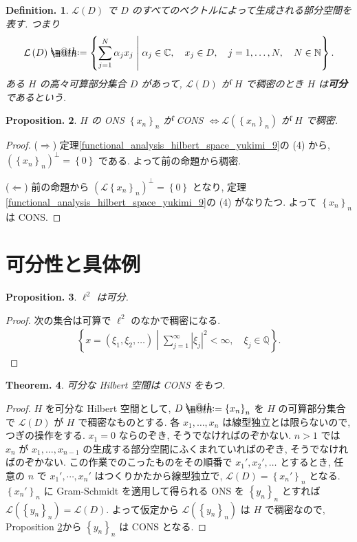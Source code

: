 \documentclass[openany, a4paper, oneside]{jsbook}
\makeatletter
\newcommand*{\defeq}{\mathrel{\rlap{%
\raisebox{0.3ex}{$\m@th\cdot$}}%
\raisebox{-0.3ex}{$\m@th\cdot$}}%
=}
\theoremstyle{break}
\newtheorem{thm}{Theorem.}[section]
\newtheorem{prop}[thm]{Proposition.}
\theoremstyle{breakdefn}
\newtheorem{defn}[thm]{Definition.}
\newcommand{\abs}[1]{\left|#1\right|}
\newcommand{\rbk}[1]{\left (#1\right)}
\newcommand{\cbk}[1]{\left\{#1\right\}}
\newcommand{\relmiddle}[1]{\mathrel{}\middle#1\mathrel{}}
\newcommand{\set}[2]{\left\{#1 \relmiddle| #2\right\}}
\newcommand{\bbC}{\mathbb{C}}
\newcommand{\bbN}{\mathbb{N}}
\newcommand{\bbQ}{\mathbb{Q}}
\newcommand{\calL}{\mathcal{L}}
\newcommand{\upbf}[1]{\textup{\textbf{#1}}}
\makeatother
\begin{document}
\begin{defn}
 $\mathcal{L}(D)$ で $D$ のすべてのベクトルによって生成される部分空間を表す.
 つまり
 \begin{align}
  \calL \rbk{D}
  \defeq
  \set{\sum_{j=1}^N \alpha_j x_j}{\alpha_j \in \bbC, \quad x_j \in D, \quad j = 1, \dots, N, \quad N \in \bbN}.
 \end{align}
 ある $H$ の高々可算部分集合 $D$ があって, $\calL (D)$ が $H$ で稠密のとき $H$ は\upbf{可分}であるという.
\end{defn}

\begin{prop}\label{functional_analysis_hilbert_space_yukimi_10}
 $H$ の ONS $\cbk{x_n}_n$ が CONS $\Longleftrightarrow \calL(\cbk{x_n}_n)$ が $H$ で稠密.
\end{prop}
\begin{proof}
($\Longrightarrow$)
定理\ref{functional_analysis_hilbert_space_yukimi_9}の (4) から,
$(\cbk{x_n}_n)^\perp = \cbk{0}$ である.
よって前の命題から稠密.

($\Longleftarrow$)
前の命題から $(\calL \cbk{x_n}_n)^\perp = \cbk{0}$ となり,
定理 \ref{functional_analysis_hilbert_space_yukimi_9}の (4) がなりたつ.
よって $\cbk{x_n}_n$ は CONS.
\end{proof}
\section{可分性と具体例}


\begin{prop}
 $\ell^2$ は可分.
\end{prop}
\begin{proof}
次の集合は可算で $\ell^2$ のなかで稠密になる.
\begin{align}
 \set{x = \rbk{\xi_1, \xi_2, \dots}}{\sum_{j=1}^{\infty} \abs{\xi_j}^2 < \infty, \quad \xi_j \in \bbQ}.
\end{align}
\end{proof}

\begin{thm}
 可分な Hilbert 空間は CONS をもつ.
\end{thm}
\begin{proof}
$H$ を可分な Hilbert 空間として, $D \defeq \cbk{x_n}_n$ を $H$ の可算部分集合で
$\calL (D)$ が $H$ で稠密なものとする.
各 $x_1, \dots, x_n$ は線型独立とは限らないので, つぎの操作をする.
$x_1 = 0$ ならのぞき, そうでなければのぞかない.
$n > 1$ では $x_n$ が $x_1, \dots, x_{n-1}$ の生成する部分空間にふくまれていればのぞき, そうでなければのぞかない.
この作業でのこったものをその順番で $x_{1}', x_{2}', \dots$ とするとき,
任意の $n$ で $x_{1}', \cdots, x_{n}'$ はつくりかたから線型独立で,
$\calL(D) = \cbk{x_{n}'}_{n}$ となる.
$\cbk{x_n'}_n$ に Gram-Schmidt を適用して得られる ONS を $\cbk{y_n}_n$ とすれば
$\calL(\cbk{y_n}_n) = \calL (D)$.
よって仮定から $\calL (\cbk{y_n}_n)$ は $H$ で稠密なので,
Proposition \ref{functional_analysis_hilbert_space_yukimi_10}から $\cbk{y_n}_n$ は CONS となる.
\end{proof}
\end{document}
